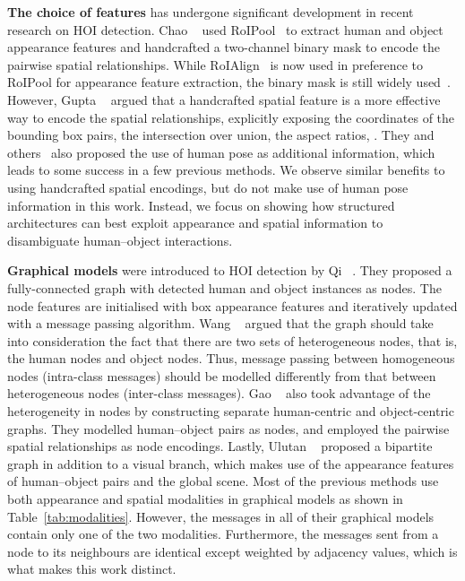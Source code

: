 \documentclass[10pt,twocolumn,letterpaper]{article}
\begin{document}
\textbf{The choice of features} has undergone significant development in recent research on HOI detection. Chao \etal~\cite{chao2018} used RoIPool~\cite{girshick2015} to extract human and object appearance features and handcrafted a two-channel binary mask to encode the pairwise spatial relationships. While RoIAlign~\cite{he2017} is now used in preference to RoIPool for appearance feature extraction, the binary mask is still widely used~\cite{gao2018,gao2020,li2019,ulutan2020,wang2020}. However, Gupta \etal~\cite{gupta2019} argued that a handcrafted spatial feature is a more effective way to encode the spatial relationships, explicitly exposing the coordinates of the bounding box pairs, the intersection over union, the aspect ratios, \etc. They and others~\cite{li2019,zhou2019,wan2019} also proposed the use of human pose as additional information, which leads to some success in a few previous methods. We observe similar benefits to using handcrafted spatial encodings, but do not make use of human pose information in this work. Instead, we focus on showing how structured architectures can best exploit appearance and spatial information to disambiguate human--object interactions.

\textbf{Graphical models} were introduced to HOI detection by Qi \etal~\cite{qi2018}. They proposed a fully-connected graph with detected human and object instances as nodes. The node features are initialised with box appearance features and iteratively updated with a message passing algorithm. Wang \etal~\cite{wang2020} argued that the graph should take into consideration the fact that there are two sets of heterogeneous nodes, that is, the human nodes and object nodes. Thus, message passing between homogeneous nodes (intra-class messages) should be modelled differently from that between heterogeneous nodes (inter-class messages). Gao \etal~\cite{gao2020} also took advantage of the heterogeneity in nodes by constructing separate human-centric and object-centric graphs. They modelled human--object pairs as nodes, and employed the pairwise spatial relationships as node encodings. Lastly, Ulutan \etal~\cite{ulutan2020} proposed a bipartite graph in addition to a visual branch, which makes use of the appearance features of human--object pairs and the global scene. Most of the previous methods use both appearance and spatial modalities in graphical models as shown in Table~\ref{tab:modalities}. However, the messages in all of their graphical models contain only one of the two modalities. Furthermore, the messages sent from a node to its neighbours are identical except weighted by adjacency values, which is what makes this work distinct.
\end{document}
